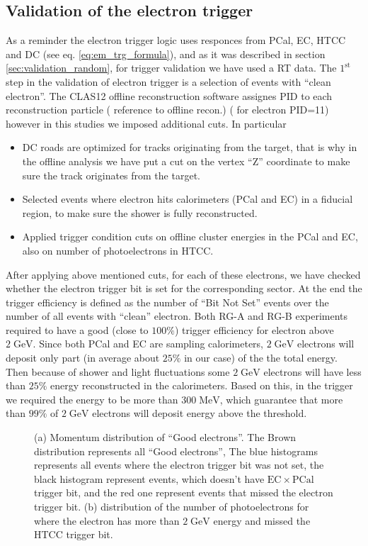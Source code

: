 \subsection{Validation of the electron trigger}
As a reminder the electron trigger logic uses responces from PCal, EC, HTCC and DC (see eq. \ref{eq:em_trg_formula}), and as it was described in section \ref{sec:validation_random}, for trigger validation we have used a RT data. 
The $\mathrm{1^{st}}$ step in the validation of electron trigger is a selection of  events with ``clean electron''. The CLAS12 offline reconstruction software assignes PID to each reconstruction particle ({\color{Red} reference to offline recon.}) ( for electron PID=11) however in this studies we imposed additional cuts. 
In particular 
\begin{itemize}
 \item DC roads are optimized for tracks originating from the target, that is why in the offline analysis we have put a cut on the vertex ``Z'' coordinate to make sure the track originates from the target.
 \item Selected events where electron hits calorimeters (PCal and EC) in a fiducial region, to make sure the shower is fully reconstructed.
 \item Applied trigger condition cuts on offline cluster energies in the PCal and EC, also on number of photoelectrons in HTCC.
\end{itemize}
After applying above mentioned cuts, for each of these electrons, we have checked whether the electron trigger bit is set for the corresponding sector. At the end the trigger efficiency is defined as the number of ``Bit Not Set'' events over the number of all events with ``clean'' electron.
Both RG-A and RG-B experiments required to have a good (close to $100 \%$) trigger efficiency for electron above $\mathrm{2\;GeV}$. Since both PCal and EC are sampling calorimeters, $\mathrm{2\;GeV}$ electrons will deposit only part (in average about $25\%$ in our case) of the the total energy. Then because of shower and light fluctuations some $\mathrm{2\;GeV}$ electrons will have less than $\mathrm{25\%}$ energy reconstructed in the calorimeters. Based on this, in the trigger we required the energy to be more than $\mathrm{300 \; MeV}$, which guarantee that more than $\mathrm{99\%}$ of $\mathrm{2\;GeV}$ electrons will deposit energy above the threshold.

\begin{figure}[!htb]
 \centering
 \caption{(a) Momentum distribution of ``Good electrons''. The Brown distribution represents all ``Good electrons'', The blue histograms represents all events where the electron trigger bit was not set, the black histogram represent events, which doesn't have $\mathrm{EC}\times \mathrm{PCal}$ trigger bit, and the red one represent events that missed the electron trigger bit. (b) distribution of the number of photoelectrons for where the electron has more than $\mathrm{2\;GeV}$ energy and missed the HTCC trigger bit.}
\end{figure}
